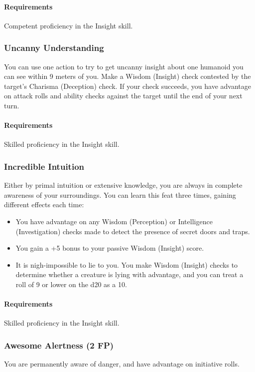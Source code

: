     \paragraph{Requirements} Competent proficiency in the Insight skill.
\subsubsection{Uncanny Understanding} \label{feat::uncannyinsight}
    You can use one action to try to get uncanny insight about one humanoid you can see within 9 meters of you.
    Make a Wisdom (Insight) check contested by the target's Charisma (Deception) check.
    If your check succeeds, you have advantage on attack rolls and ability checks against the target until the end of your next turn.
    \paragraph{Requirements} Skilled proficiency in the Insight skill.
\subsubsection{Incredible Intuition} \label{feat::incredibleintuition}
    Either by primal intuition or extensive knowledge, you are always in complete awareness of your surroundings.
    You can learn this feat three times, gaining different effects each time:
    \begin{itemize}
        \item You have advantage on any Wisdom (Perception) or Intelligence (Investigation) checks made to detect the presence of secret doors and traps.
        \item You gain a +5 bonus to your passive Wisdom (Insight) score.
        \item It is nigh-impossible to lie to you.
        You make Wisdom (Insight) checks to determine whether a creature is lying with advantage, and you can treat a roll of 9 or lower on the d20 as a 10.
    \end{itemize}
    \paragraph{Requirements} Skilled proficiency in the Insight skill.
\subsubsection{Awesome Alertness (2 FP)} \label{feat::awesomealertness}
    You are permanently aware of danger, and have advantage on initiative rolls.


